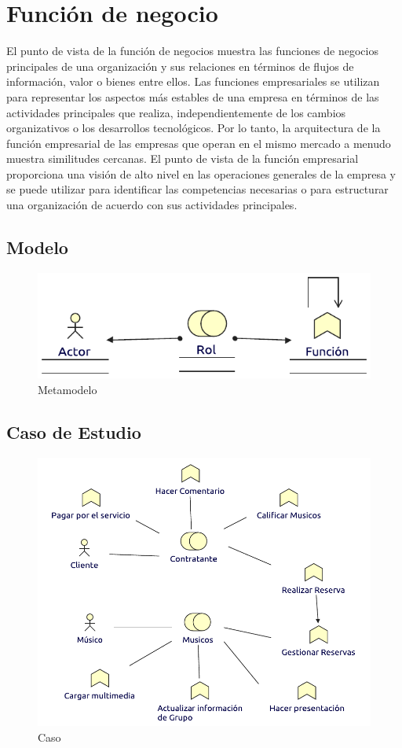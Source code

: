 \section{Función de negocio}
El punto de vista de la función de negocios muestra las funciones de negocios principales de una organización y sus relaciones en términos de flujos de información, valor o bienes entre ellos. Las funciones empresariales se utilizan para representar los aspectos más estables de una empresa en términos de las actividades principales que realiza, independientemente de los cambios organizativos o los desarrollos tecnológicos. Por lo tanto, la arquitectura de la función empresarial de las empresas que operan en el mismo mercado a menudo muestra similitudes cercanas. El punto de vista de la función empresarial proporciona una visión de alto nivel en las operaciones generales de la empresa y se puede utilizar para identificar las competencias necesarias o para estructurar una organización de acuerdo con sus actividades principales.
\subsection{Modelo}
\begin{figure}[h!]
	\centering
	\includegraphics[width=0.8\linewidth]{Arquitectura/Negocio/imgs/FuncionNegocioMetamodelo.pdf}
	\caption{Metamodelo}
\end{figure}
\newpage
\subsection{Caso de Estudio}

\begin{figure}[h!]
	\centering
	\includegraphics[width=\linewidth]{Arquitectura/Negocio/imgs/FuncionNegocio.pdf}
	\caption{Caso}
\end{figure}
\newpage  

